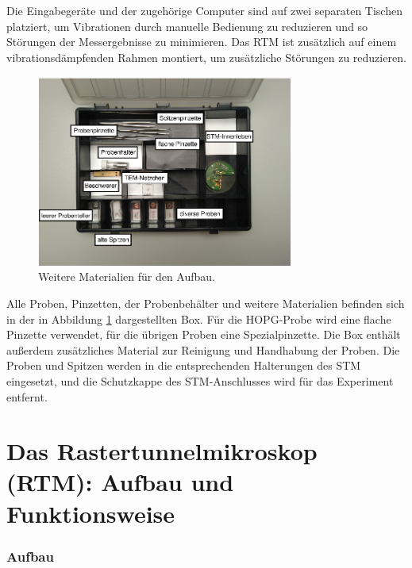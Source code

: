 Die Eingabegeräte und der zugehörige Computer sind auf zwei separaten Tischen platziert, um Vibrationen durch manuelle Bedienung zu reduzieren und so Störungen der Messergebnisse zu minimieren. Das RTM ist zusätzlich auf einem vibrationsdämpfenden Rahmen montiert, um zusätzliche Störungen zu reduzieren.
\begin{figure}
    \centering
    \includegraphics[width=0.75\textwidth]{figs/Versuch_box}
    \caption{Weitere Materialien für den Aufbau. \cite{praktikum}}
    \label{fig:Versuch box}
\end{figure}
 Alle Proben, Pinzetten, der Probenbehälter und weitere Materialien befinden sich in der in Abbildung \ref{fig:Versuch box} dargestellten Box. Für die HOPG-Probe wird eine flache Pinzette verwendet, für die übrigen Proben eine Spezialpinzette. Die Box enthält außerdem zusätzliches Material zur Reinigung und Handhabung der Proben. Die Proben und Spitzen werden in die entsprechenden Halterungen des STM eingesetzt, und die Schutzkappe des STM-Anschlusses wird für das Experiment entfernt.

\section{Das Rastertunnelmikroskop (RTM): Aufbau und Funktionsweise}

\subsubsection{Aufbau}

